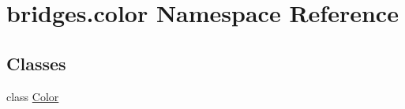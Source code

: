 \hypertarget{namespacebridges_1_1color}{}\section{bridges.\+color Namespace Reference}
\label{namespacebridges_1_1color}
\subsection*{Classes}
\begin{DoxyCompactItemize}
\item 
class \hyperlink{classbridges_1_1color_1_1_color}{Color}
\end{DoxyCompactItemize}
